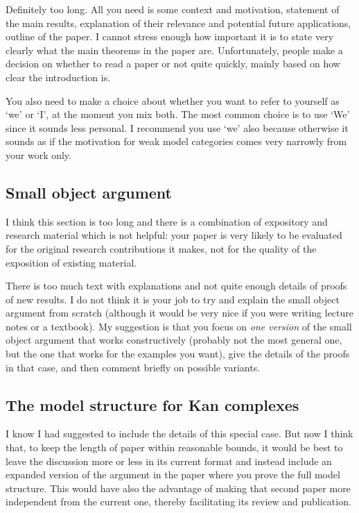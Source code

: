\documentclass[11pt, oneside]{article}   	%
\begin{document}
Definitely too long. All you need is some context and motivation, statement of the main results, explanation of their relevance and potential future applications, outline of the paper. I cannot stress enough how important it is to state very clearly what the main theorems in the paper are. Unfortunately, people make a decision on whether to read a paper or not quite quickly, mainly based on how clear the introduction is. 

You also need to make a choice about whether you want to refer to yourself as `we' or `I', at the moment you mix both. The most common choice is to use `We' since it sounds less personal. I recommend you use `we' also because otherwise it sounds as if the motivation for weak model categories comes very narrowly from your work only. 

\subsection*{Small object argument} 

I think this section is too long and there is a combination of expository and research material which is not helpful: your paper is very likely to be evaluated for the original research contributions it makes, not for the
quality of the exposition of existing material.

There is too much text with explanations and not quite enough details of proofs of new results.  I do not think it is your job to try and explain the small object argument from scratch (although it would be very nice if you were writing lecture notes or a textbook). My suggestion is that you focus on {\em one version} of the small object argument that works constructively (probably not the most general one, but the one that works for the examples you want), give the details of the proofs in that case, and 
then comment briefly on possible variants. 

\subsection*{The model structure for Kan complexes}

I know I had suggested to include the details of this special case. But now I think that, to keep the length of paper within reasonable bounds, it would be best to leave the discussion more or less in its current format
and instead include an expanded version of the argument in the paper where you prove the full model structure. This would have also the advantage of making that second paper more independent from the current one, thereby facilitating its review and publication. 
\end{document}
